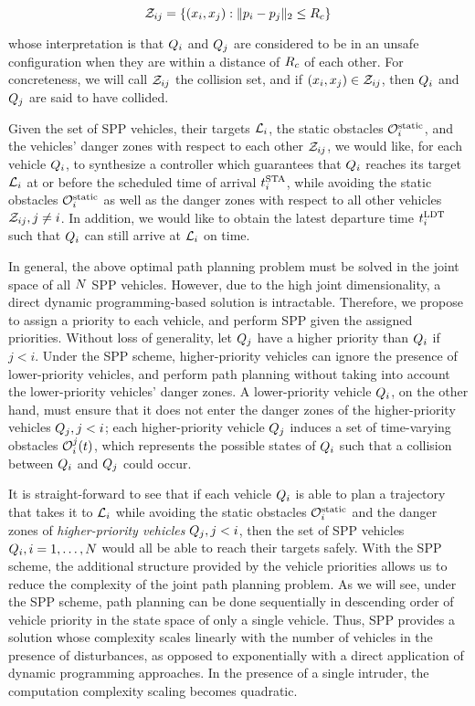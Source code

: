 \begin{equation}
\mathcal{Z}_{ij} = \{(x_i, x_j): \|p_i - p_j\|_2 \le R_c\}
\end{equation}

\noindent whose interpretation is that $Q_i$ and $Q_j$ are considered to be in an unsafe configuration when they are within a distance of $R_c$ of each other. For concreteness, we will call $\mathcal{Z}_{ij}$ the collision set, and if $(x_i, x_j) \in \mathcal{Z}_{ij}$, then $Q_i$ and $Q_j$ are said to have collided.

Given the set of SPP vehicles, their targets $\mathcal{L}_i$, the static obstacles $\mathcal{O}^\text{static}_i$, and the vehicles' danger zones with respect to each other $\mathcal{Z}_{ij}$, we would like, for each vehicle $Q_i$, to synthesize a controller which guarantees that $Q_i$ reaches its target $\mathcal{L}_i$ at or before the scheduled time of arrival $t^\text{STA}_i$, while avoiding the static obstacles $\mathcal{O}^\text{static}_i$ as well as the danger zones with respect to all other vehicles $\mathcal{Z}_{ij}, j\neq i$. In addition, we would like to obtain the latest departure time $t^\text{LDT}_i$ such that $Q_i$ can still arrive at $\mathcal{L}_i$ on time.

In general, the above optimal path planning problem must be solved in the joint space of all $N$ SPP vehicles. However, due to the high joint dimensionality, a direct dynamic programming-based solution is intractable. Therefore, we propose to assign a priority to each vehicle, and perform SPP given the assigned priorities. Without loss of generality, let $Q_j$ have a higher priority than $Q_i$ if $j<i$. Under the SPP scheme, higher-priority vehicles can ignore the presence of lower-priority vehicles, and perform path planning without taking into account the lower-priority vehicles' danger zones. A lower-priority vehicle $Q_i$, on the other hand, must ensure that it does not enter the danger zones of the higher-priority vehicles $Q_j, j<i$; each higher-priority vehicle $Q_j$ induces a set of time-varying obstacles $\mathcal{O}_i^j(t)$, which represents the possible states of $Q_i$ such that a collision between $Q_i$ and $Q_j$ could occur.

It is straight-forward to see that if each vehicle $Q_i$ is able to plan a trajectory that takes it to $\mathcal{L}_i$ while avoiding the static obstacles $\mathcal{O}^\text{static}_i$ and the danger zones of \textit{higher-priority vehicles} $Q_j, j<i$, then the set of SPP vehicles $Q_i, i=1,\ldots,N$ would all be able to reach their targets safely. With the SPP scheme, the additional structure provided by the vehicle priorities allows us to reduce the complexity of the joint path planning problem. As we will see, under the SPP scheme, path planning can be done sequentially in descending order of vehicle priority in the state space of only a single vehicle. Thus, SPP provides a solution whose complexity scales linearly with the number of vehicles in the presence of disturbances, as opposed to exponentially with a direct application of dynamic programming approaches. In the presence of a single intruder, the computation complexity scaling becomes quadratic.

